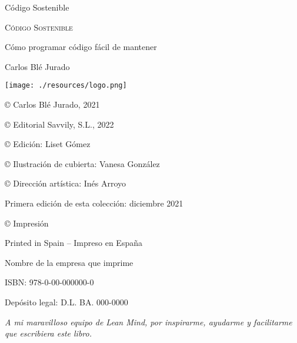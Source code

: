 \documentclass[10pt]{article}
\begin{document}
\newpage\phantom{blabla}\thispagestyle{empty}
\newpage\phantom{blabla}\thispagestyle{empty}
\newpage\phantom{blabla}\thispagestyle{empty}

\begin{titlepage}
  {\large\phantom{blabla} \par}
  \vspace{1cm}
  {\huge\centering Código Sostenible \par}
\end{titlepage}

\newpage\phantom{blabla}\thispagestyle{empty}

\begin{titlepage}\thispagestyle{empty}
  {\large\phantom{blabla} \par}
  \vspace{1cm}
  {\scshape\Huge\centering Código Sostenible \par}
  \vspace{0.5cm}
  {\normalsize\centering Cómo programar código fácil de mantener \par}
  \vspace{1cm}
  {\large\centering Carlos Blé Jurado \par}
  \vspace{8.5cm}
  \begin{center}
    {\texttt{[image: ./resources/logo.png]}}
  \end{center}
\end{titlepage}

\begin{titlepage}\thispagestyle{empty}
  \vspace*{\fill}
  {\normalsize © Carlos Blé Jurado, 2021 \par}
  {\normalsize © Editorial Savvily, S.L., 2022 \par}
  {\normalsize © Edición: Liset Gómez \par}
  {\normalsize © Ilustración de cubierta: Vanesa González \par}
  {\normalsize © Dirección artística: Inés Arroyo \par}
  {\normalsize Primera edición de esta colección: diciembre 2021 \par}
  {\normalsize © Impresión \par}
  {\normalsize Printed in Spain – Impreso en España \par}
  {\normalsize Nombre de la empresa que imprime \par}
  {\normalsize ISBN: 978-0-00-000000-0 \par}
  {\normalsize Depósito legal: D.L. BA. 000-0000 \par}
\end{titlepage}

\begin{titlepage}\thispagestyle{empty}
  {\itshape\small\raggedleft A mi maravilloso equipo de Lean Mind, por inspirarme, ayudarme y facilitarme que escribiera este libro. \par}
  \restoregeometry
\end{titlepage}

\newpage\phantom{blabla}\thispagestyle{empty}
\end{document}
